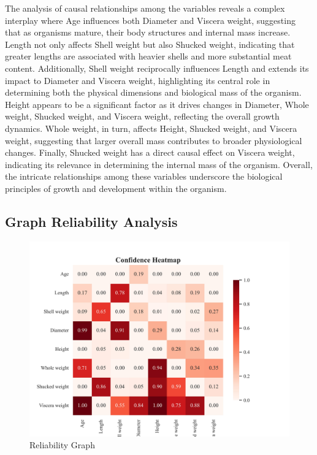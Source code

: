 \documentclass{article}
\begin{document}
The analysis of causal relationships among the variables reveals a complex interplay where Age influences both Diameter and Viscera weight, suggesting that as organisms mature, their body structures and internal mass increase. Length not only affects Shell weight but also Shucked weight, indicating that greater lengths are associated with heavier shells and more substantial meat content. Additionally, Shell weight reciprocally influences Length and extends its impact to Diameter and Viscera weight, highlighting its central role in determining both the physical dimensions and biological mass of the organism. Height appears to be a significant factor as it drives changes in Diameter, Whole weight, Shucked weight, and Viscera weight, reflecting the overall growth dynamics. Whole weight, in turn, affects Height, Shucked weight, and Viscera weight, suggesting that larger overall mass contributes to broader physiological changes. Finally, Shucked weight has a direct causal effect on Viscera weight, indicating its relevance in determining the internal mass of the organism. Overall, the intricate relationships among these variables underscore the biological principles of growth and development within the organism.

\subsection{Graph Reliability Analysis}

\begin{figure}[H]
    \centering
    \vspace{-0.5cm}
    \includegraphics[width=0.8\linewidth]{data/dataset/Abalone/output_graph/confidence_heatmap.jpg}
    \caption{Reliability Graph}
    \label{fig:sub3}
\end{figure}
\end{document}
